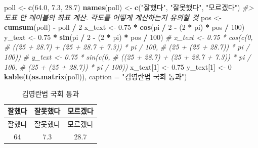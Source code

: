\documentclass[
]{article}
\newenvironment{Shaded}{\begin{snugshade}}{\end{snugshade}}
\newcommand{\CommentTok}[1]{\textcolor[rgb]{0.56,0.35,0.01}{\textit{#1}}}
\newcommand{\DataTypeTok}[1]{\textcolor[rgb]{0.13,0.29,0.53}{#1}}
\newcommand{\DecValTok}[1]{\textcolor[rgb]{0.00,0.00,0.81}{#1}}
\newcommand{\FloatTok}[1]{\textcolor[rgb]{0.00,0.00,0.81}{#1}}
\newcommand{\KeywordTok}[1]{\textcolor[rgb]{0.13,0.29,0.53}{\textbf{#1}}}
\newcommand{\NormalTok}[1]{#1}
\newcommand{\OperatorTok}[1]{\textcolor[rgb]{0.81,0.36,0.00}{\textbf{#1}}}
\newcommand{\StringTok}[1]{\textcolor[rgb]{0.31,0.60,0.02}{#1}}
\begin{document}
\begin{Shaded}
\begin{Highlighting}[]
\NormalTok{poll \textless{}{-}}\StringTok{ }\KeywordTok{c}\NormalTok{(}\FloatTok{64.0}\NormalTok{, }\FloatTok{7.3}\NormalTok{, }\FloatTok{28.7}\NormalTok{)}
\KeywordTok{names}\NormalTok{(poll) \textless{}{-}}\StringTok{ }\KeywordTok{c}\NormalTok{(}\StringTok{"잘했다"}\NormalTok{, }\StringTok{"잘못했다"}\NormalTok{, }\StringTok{"모르겠다"}\NormalTok{)}
\CommentTok{\#\textgreater{} 도표 안 레이블의 좌표 계산. 각도를 어떻게 계산하는지 유의할 것}
\NormalTok{pos \textless{}{-}}\StringTok{ }\KeywordTok{cumsum}\NormalTok{(poll) }\OperatorTok{{-}}\StringTok{ }\NormalTok{poll }\OperatorTok{/}\StringTok{ }\DecValTok{2}
\NormalTok{x\_text \textless{}{-}}\StringTok{ }\FloatTok{0.75} \OperatorTok{*}\StringTok{ }\KeywordTok{cos}\NormalTok{(pi }\OperatorTok{/}\StringTok{ }\DecValTok{2} \OperatorTok{{-}}\StringTok{ }\NormalTok{(}\DecValTok{2} \OperatorTok{*}\StringTok{ }\NormalTok{pi) }\OperatorTok{*}\StringTok{ }\NormalTok{pos }\OperatorTok{/}\StringTok{ }\DecValTok{100}\NormalTok{)}
\NormalTok{y\_text \textless{}{-}}\StringTok{ }\FloatTok{0.75} \OperatorTok{*}\StringTok{ }\KeywordTok{sin}\NormalTok{(pi }\OperatorTok{/}\StringTok{ }\DecValTok{2} \OperatorTok{{-}}\StringTok{ }\NormalTok{(}\DecValTok{2} \OperatorTok{*}\StringTok{ }\NormalTok{pi) }\OperatorTok{*}\StringTok{ }\NormalTok{pos }\OperatorTok{/}\StringTok{ }\DecValTok{100}\NormalTok{)}
\CommentTok{\# x\_text \textless{}{-} 0.75 * cos(c(0, }
\CommentTok{\#                        ((25 + 28.7) + (25 + 28.7 + 7.3)) * pi / 100, }
\CommentTok{\#                        (25 + (25 + 28.7)) * pi / 100))}
\CommentTok{\# y\_text \textless{}{-} 0.75 * sin(c(0, }
\CommentTok{\#                        ((25 + 28.7) + (25 + 28.7 + 7.3)) * pi / 100, }
\CommentTok{\#                        (25 + (25 + 28.7)) * pi / 100))}
\NormalTok{x\_text[}\DecValTok{1}\NormalTok{] \textless{}{-}}\StringTok{ }\FloatTok{0.75}
\NormalTok{y\_text[}\DecValTok{1}\NormalTok{] \textless{}{-}}\StringTok{ }\DecValTok{0}
\KeywordTok{kable}\NormalTok{(}\KeywordTok{t}\NormalTok{(}\KeywordTok{as.matrix}\NormalTok{(poll)), }\DataTypeTok{caption =} \StringTok{"김영란법 국회 통과"}\NormalTok{)}
\end{Highlighting}
\end{Shaded}

\begin{longtable}[]{@{}ccc@{}}
\caption{김영란법 국회 통과}\tabularnewline
\toprule
잘했다 & 잘못했다 & 모르겠다\tabularnewline
\midrule
\endfirsthead
\toprule
잘했다 & 잘못했다 & 모르겠다\tabularnewline
\midrule
\endhead
64 & 7.3 & 28.7\tabularnewline
\bottomrule
\end{longtable}
\end{document}
